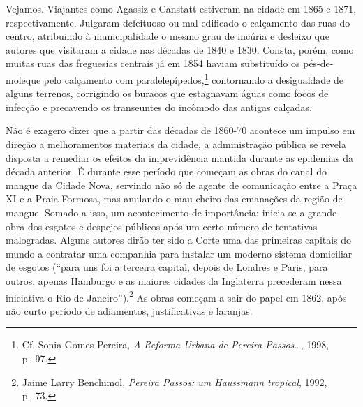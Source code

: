 Vejamos. Viajantes como Agassiz e Canstatt estiveram na cidade em 1865 e
1871, respectivamente. Julgaram defeituoso ou mal edificado o calçamento
das ruas do centro, atribuindo à municipalidade o mesmo grau de incúria
e desleixo que autores que visitaram a cidade nas décadas de 1840 e
1830. Consta, porém, como muitas ruas das freguesias centrais já em 1854
haviam substituído os pés-de-moleque pelo calçamento com
paralelepípedos,\footnote{Cf. Sonia Gomes Pereira, \emph{A Reforma
  Urbana de Pereira Passos}\ldots{}, 1998, p.~97.} contornando a
desigualdade de alguns terrenos, corrigindo os buracos que estagnavam
águas como focos de infecção e precavendo os transeuntes do incômodo das
antigas calçadas.

Não é exagero dizer que a partir das décadas de 1860-70 acontece um
impulso em direção a melhoramentos materiais da cidade, a administração
pública se revela disposta a remediar os efeitos da imprevidência
mantida durante as epidemias da década anterior. É durante esse período
que começam as obras do canal do mangue da Cidade Nova, servindo não só
de agente de comunicação entre a Praça XI e a Praia Formosa, mas
anulando o mau cheiro das emanações da região de mangue. Somado a isso,
um acontecimento de importância: inicia-se a grande obra dos esgotos e
despejos públicos após um certo número de tentativas malogradas. Alguns
autores dirão ter sido a Corte uma das primeiras capitais do mundo a
contratar uma companhia para instalar um moderno sistema domiciliar de
esgotos (``para uns foi a terceira capital, depois de Londres e Paris;
para outros, apenas Hamburgo e as maiores cidades da Inglaterra
precederam nessa iniciativa o Rio de Janeiro'').\footnote{Jaime Larry
  Benchimol, \emph{Pereira Passos: um Haussmann tropical}, 1992, p.~73.}
As obras começam a sair do papel em 1862, após não curto período de
adiamentos, justificativas e laranjas.

